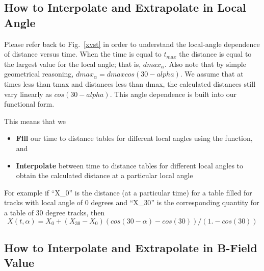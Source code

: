 \documentclass{article}
\begin{document}
\subsection{How to Interpolate and Extrapolate in Local Angle}
Please refer back to Fig.~\ref{xvst} in order to understand the local-angle dependence
of distance versus time.  When the time is equal to $t_{max}$ the distance is equal to
the largest value for the local angle; that is, $dmax_{\alpha}$.  Also note that by
simple geometrical reasoning, $dmax_{\alpha} = dmax  cos(30-alpha)$.
We assume that at times less than tmax and distances less than dmax, the calculated
distances still vary linearly as $cos(30-alpha)$.  This angle dependence is built into
our functional form.

This means that we
\begin{itemize}
\item {\bf Fill} our time to distance tables for different local angles using the function, and
\item {\bf Interpolate} between time to distance tables for different local angles to obtain
the calculated distance at a particular local angle
\end{itemize}
For example if ``X_0'' is the distance (at a particular time) for a table filled for tracks with local angle of 0 degrees
and ``X_{30}'' is the corresponding quantity for a table of 30 degree tracks, then
\begin{equation} 
\label{eq-extrap30}
X(t,\alpha) = X_0 + (X_{30}-X_0) (cos(30-\alpha) - cos(30)) / (1. - cos(30))
\end{equation}


\subsection{How to Interpolate and Extrapolate in B-Field Value}




\end{document}
